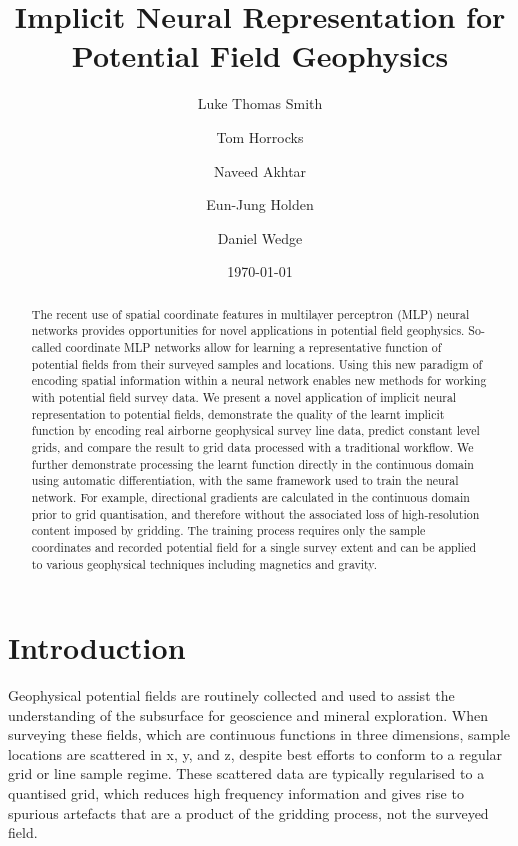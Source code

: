 \documentclass[manuscript.tex]{subfiles}
\begin{document}
\setcounter{chapter}{1}
\author{{Luke Thomas Smith} \and{Tom Horrocks} \and{Naveed Akhtar} \and{Eun-Jung Holden} \and{Daniel Wedge}}
\title{Implicit Neural Representation for Potential Field Geophysics }
\date{\today}
\maketitle{}

\begin{abstract}
    The recent use of spatial coordinate features in multilayer perceptron (MLP) neural networks provides opportunities for novel applications in potential field geophysics.
    So-called coordinate MLP networks allow for learning a representative function of potential fields from their surveyed samples and locations.
    Using this new paradigm of encoding spatial information within a neural network enables new methods for working with potential field survey data.
    We present a novel application of implicit neural representation to potential fields, demonstrate the quality of the learnt implicit function by encoding real airborne geophysical survey line data, predict constant level grids, and compare the result to grid data processed with a traditional workflow.
    We further demonstrate processing the learnt function directly in the continuous domain using automatic differentiation, with the same framework used to train the neural network.
    For example, directional gradients are calculated in the continuous domain prior to grid quantisation, and therefore without the associated loss of high-resolution content imposed by gridding.
    The training process requires only the sample coordinates and recorded potential field for a single survey extent and can be applied to various geophysical techniques including magnetics and gravity.
\end{abstract}

\section{Introduction}
Geophysical potential fields are routinely collected and used to assist the understanding of the subsurface for geoscience and mineral exploration.
When surveying these fields, which are continuous functions in three dimensions, sample locations are scattered in x, y, and z, despite best efforts to conform to a regular grid or line sample regime.
These scattered data are typically regularised to a quantised grid, which reduces high frequency information and gives rise to spurious artefacts that are a product of the gridding process, not the surveyed field.
\end{document}
